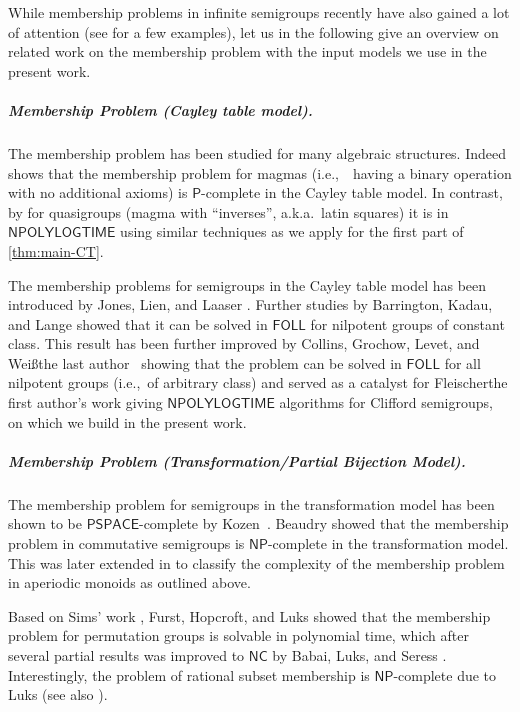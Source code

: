 \documentclass[anonymous,letter,UKenglish,cleveref,autoref,thm-restate]{lipics-v2021}
\newcommand{\ie}{i.e.,~}
\newcommand{\Ptime}{\ensuremath{\mathsf{P}}\xspace}
\newcommand{\NPOLYLOGTIME}{\ensuremath{\mathsf{NPOLYLOGTIME}}\xspace}
\newcommand{\NC}{\ensuremath{\mathsf{NC}}\xspace}
\newcommand{\NP}{\ensuremath{\mathsf{NP}}\xspace}
\newcommand{\PSPACE}{\ensuremath{\mathsf{PSPACE}}\xspace}
\theoremstyle{plain}
\theoremstyle{plain}
\newcommand{\mysubparagraph}[1]{\vspace*{-2mm}\subparagraph*{#1}}
\begin{document}
While membership problems in infinite semigroups recently have also gained a lot of attention (see \cite{ChoffrutK05,BellHP17,DiekertPS2024,Dong24} for a few examples), let us in the following give an overview on related work on the membership problem with the input models we use in the present work.



\mysubparagraph{Membership Problem (Cayley table model).}

The membership problem has been studied for many algebraic structures.
Indeed \cite{JonesL76} shows that the membership problem for magmas (\ie\ having a binary operation with no additional axioms) is \Ptime-complete in the Cayley table model.
In contrast, by \cite{CollinsGLW24} for quasigroups (magma with ``inverses'', a.k.a.\ latin squares) it is in \NPOLYLOGTIME using similar techniques as  we apply for the first part of \cref{thm:main-CT}. 

The membership problems for semigroups in the Cayley table model has been introduced by Jones, Lien, and Laaser \cite{JonesLL76}.
Further studies by Barrington, Kadau, and Lange \cite{BarringtonKLM01} showed that it can be solved in $\mathsf{FOLL}$ for nilpotent groups of constant class.
This result has been further improved by Collins, Grochow, Levet, and \ifAnonimous Weiß\else the last author\fi~\cite{CollinsGLW24} showing that the problem can be solved in $\mathsf{FOLL}$ for all nilpotent groups (\ie of arbitrary class) and served as a catalyst for \ifAnonimous Fleischer\else the first author\fi's work \cite{Fleischer19diss,Fleischer22} giving \NPOLYLOGTIME algorithms for Clifford semigroups, on which we build in the present work.

\mysubparagraph{Membership Problem (Transformation/Partial Bijection Model).}

The membership problem for semigroups in the transformation model has been shown to be $\PSPACE$-complete by Kozen~\cite{koz77}.
Beaudry \cite{Beaudry88} showed that the membership problem in commutative semigroups is \NP-complete in the transformation model.
This was later extended in \cite{Beaudry88thesis,BeaudryMT92} to classify the complexity of the membership problem in aperiodic monoids as outlined above.

Based on Sims' work \cite{Sims67}, Furst, Hopcroft, and Luks \cite{FurstHopcroftLuks80} showed that the membership problem for permutation groups is solvable in polynomial time, which after several partial results \cite{LuksM88,Luks86,McKenzieC87} was improved to \NC by Babai, Luks, and Seress \cite{BabaiLS87}.
Interestingly, the problem of rational subset membership is \NP-complete due to Luks \cite{Luks93} (see also \cite{LohreyRZ22}).
\end{document}
